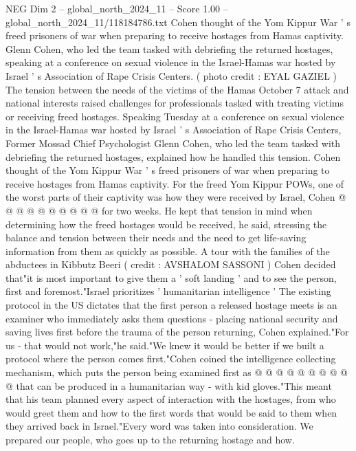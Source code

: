 \begin{textsample}{NEG Dim 2 – global\_north\_2024\_11 – Score 1.00 – global\_north\_2024\_11/118184786.txt}  \label{ex:f2_neg_097}
Cohen thought of the Yom Kippur War ' s freed prisoners of war when preparing to receive hostages from Hamas captivity.
Glenn Cohen, who led the team tasked with debriefing the returned hostages, speaking at a conference on sexual violence in the Israel-Hamas war hosted by Israel ' s Association of Rape Crisis Centers. ( photo credit : EYAL GAZIEL ) The tension between the needs of the victims of the Hamas October 7 attack and national interests raised challenges for professionals tasked with treating victims or receiving freed hostages.
Speaking Tuesday at a conference on sexual violence in the Israel-Hamas war hosted by Israel ' s Association of Rape Crisis Centers, Former Mossad Chief Psychologist Glenn Cohen, who led the team tasked with debriefing the returned hostages, explained how he handled this tension.
Cohen thought of the Yom Kippur War ' s freed prisoners of war when preparing to receive hostages from Hamas captivity.
For the freed Yom Kippur POWs, one of the worst parts of their captivity was how they were received by Israel, Cohen @ @ @ @ @ @ @ @ @ @ for two weeks.
He kept that tension in mind when determining how the freed hostages would be received, he said, stressing the balance and tension between their needs and the need to get life-saving information from them as quickly as possible.
A tour with the families of the abductees in Kibbutz Beeri ( credit : AVSHALOM SASSONI ) Cohen decided that"it is most important to give them a ' soft landing ' and to see the person, first and foremost."Israel prioritizes ' humanitarian intelligence ' The existing protocol in the US dictates that the first person a released hostage meets is an examiner who immediately asks them questions - placing national security and saving lives first before the trauma of the person returning, Cohen explained."For us - that would not work,"he said."We knew it would be better if we built a protocol where the person comes first."Cohen coined the intelligence collecting mechanism, which puts the person being examined first as @ @ @ @ @ @ @ @ @ @ that can be produced in a humanitarian way - with kid gloves."This meant that his team planned every aspect of interaction with the hostages, from who would greet them and how to the first words that would be said to them when they arrived back in Israel."Every word was taken into consideration.
We prepared our people, who goes up to the returning hostage and how.

\end{textsample}
